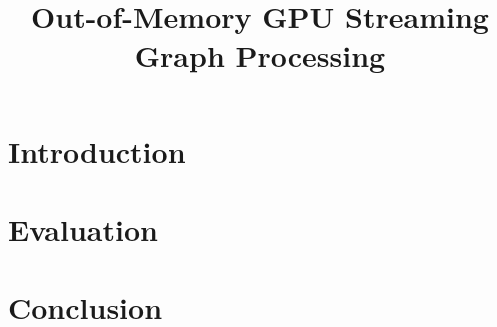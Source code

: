 \documentclass[conference]{IEEEtran}
\begin{document}
\title{Out-of-Memory GPU Streaming Graph Processing}
\author{}
\maketitle

\section{Introduction}






\section{Evaluation}

\section{Conclusion}
\end{document}
